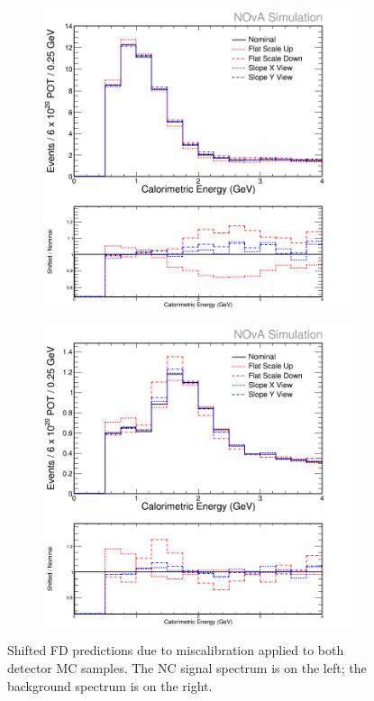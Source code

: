 \begin{figure}[p]
  \centering
  \begin{subfigure}{.48\textwidth}
    \centering
    \includegraphics[width=1\linewidth]{figures/cNCEXCalibAbsSysts.png}
  \end{subfigure}
  \begin{subfigure}{.48\textwidth}
    \centering
    \includegraphics[width=1\linewidth]{figures/cBGEXCalibAbsSysts.png}
  \end{subfigure}
  \caption[Shifted FD Predictions Due to Miscalibration at Both Detectors]{Shifted FD predictions due to miscalibration applied to both detector MC samples. The NC signal spectrum is on the left; the background spectrum is on the right.}
  \label{fig:SystCalibAbs}
\end{figure}

